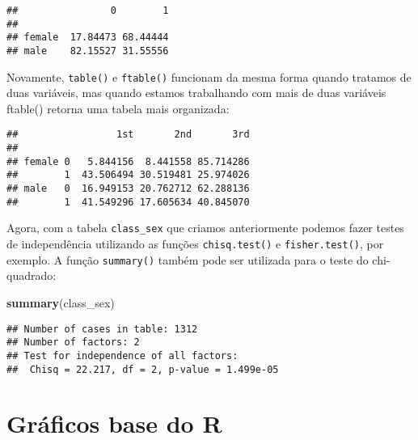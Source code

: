 \documentclass[]{book}
\newenvironment{Shaded}{\begin{snugshade}}{\end{snugshade}}
\newcommand{\DecValTok}[1]{\textcolor[rgb]{0.00,0.00,0.81}{#1}}
\newcommand{\KeywordTok}[1]{\textcolor[rgb]{0.13,0.29,0.53}{\textbf{#1}}}
\newcommand{\NormalTok}[1]{#1}
\newcommand{\OperatorTok}[1]{\textcolor[rgb]{0.81,0.36,0.00}{\textbf{#1}}}
\theoremstyle{definition}
\theoremstyle{definition}
\theoremstyle{definition}
\theoremstyle{remark}
\begin{document}
\begin{verbatim}
##                0        1
##                          
## female  17.84473 68.44444
## male    82.15527 31.55556
\end{verbatim}

Novamente, \texttt{table()} e \texttt{ftable()} funcionam da mesma forma quando tratamos de duas variáveis, mas quando estamos trabalhando com mais de duas variáveis ftable() retorna uma tabela mais organizada:

\begin{Shaded}
\end{Shaded}

\begin{verbatim}
##                 1st       2nd       3rd
##                                        
## female 0   5.844156  8.441558 85.714286
##        1  43.506494 30.519481 25.974026
## male   0  16.949153 20.762712 62.288136
##        1  41.549296 17.605634 40.845070
\end{verbatim}

Agora, com a tabela \texttt{class\_sex} que criamos anteriormente podemos fazer testes de independência utilizando as funções \texttt{chisq.test()} e \texttt{fisher.test()}, por exemplo. A função \texttt{summary()} também pode ser utilizada para o teste do chi-quadrado:

\begin{Shaded}
\begin{Highlighting}[]
\KeywordTok{summary}\NormalTok{(class_sex)}
\end{Highlighting}
\end{Shaded}

\begin{verbatim}
## Number of cases in table: 1312 
## Number of factors: 2 
## Test for independence of all factors:
##  Chisq = 22.217, df = 2, p-value = 1.499e-05
\end{verbatim}

\hypertarget{gruxe1ficos-base-do-r}{%
\section{Gráficos base do R}\label{gruxe1ficos-base-do-r}}
\end{document}
